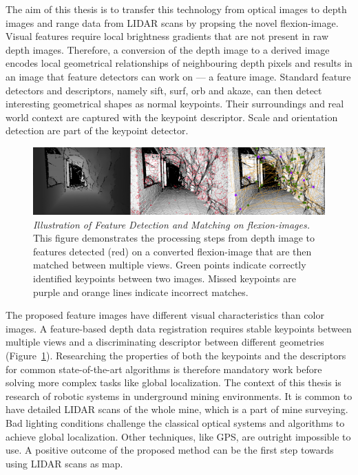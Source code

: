 The aim of this thesis is to transfer this technology from optical images to depth images and range data from \acrshort{LIDAR} scans by propsing the novel \Gls{flexion-image}.
Visual features require local brightness gradients that are not present in raw depth images.
Therefore, a conversion of the depth image to a derived image encodes local geometrical relationships of neighbouring depth pixels and results in an image that feature detectors can work on --- a feature image.
Standard feature detectors and descriptors, namely \acrshort{sift}, \acrshort{surf}, \acrshort{orb} and \acrshort{akaze}, can then detect interesting geometrical shapes as normal keypoints.
Their surroundings and real world context are captured with the keypoint descriptor.
Scale and orientation detection are part of the keypoint detector.
\begin{figure}[htb]
    \includegraphics[width=\linewidth]{chapter01/masterarbeit_method.png}
    \caption[Illustration of Feature Detection and Matching on \Glspl{flexion-image}]{\emph{Illustration of Feature Detection and Matching on \Glspl{flexion-image}.} This figure demonstrates the processing steps from depth image to features detected (red) on a converted \gls{flexion-image} that are then matched between multiple views. Green points indicate correctly identified keypoints between two images. Missed keypoints are purple and orange lines indicate incorrect matches.}\label{fig:method_example}
\end{figure}
The proposed feature images have different visual characteristics than color images.
A \gls{feature}-based depth data registration requires stable keypoints between multiple views and a discriminating descriptor between different geometries (Figure~\ref{fig:method_example}).
Researching the properties of both the keypoints and the descriptors for common state-of-the-art algorithms is therefore mandatory work before solving more complex tasks like global localization.
The context of this thesis is research of robotic systems in underground mining environments.
It is common to have detailed \acrshort{LIDAR} scans of the whole mine, which is a part of mine surveying.
Bad lighting conditions challenge the classical optical systems and algorithms to achieve global localization.
Other techniques, like GPS, are outright impossible to use.
A positive outcome of the proposed method can be the first step towards using \acrshort{LIDAR} scans as map.

